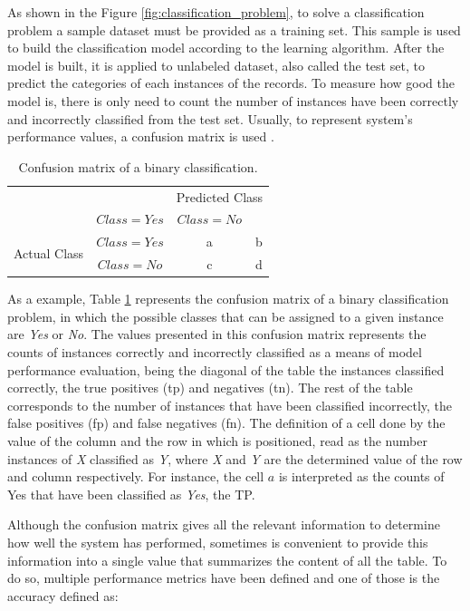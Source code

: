 As shown in the Figure \ref{fig:classification_problem}, to solve a classification problem a sample dataset must be provided as a training set. This sample is used to build the classification model according to the learning algorithm. After the model is built, it is applied to unlabeled dataset, also called the test set, to predict the categories of each instances of the records. To measure how good the model is, there is only need to count the number of instances have been correctly and incorrectly classified from the test set. Usually, to represent system's performance values, a confusion matrix is used \cite{hamilton2000confusion}. 


\begin{table}[!htp]
\centering
\begin{tabular}{ |c|c|c|c| }
\hline
\multicolumn{2}{|c|}{} & \multicolumn{2}{c|}{Predicted Class} \\
\hhline{~~--}
\multicolumn{2}{|c|}{} & $Class = Yes$ & $Class = No$ \\ \hline
\multirow{2}{*}{Actual Class} & $Class = Yes$ & a & b \\
\hhline{~---}
& $Class = No$ & c & d \\
\hline
\end{tabular}
\caption{Confusion matrix of a binary classification.}
\label{tab:confusion_matrix}
\end{table}

As a example, Table \ref{tab:confusion_matrix} represents the confusion matrix of a binary classification problem, in which the possible classes that can be assigned to a given instance are \textit{Yes} or \textit{No}. The values presented in this confusion matrix represents the counts of instances correctly and incorrectly classified as a means of model performance evaluation, being the diagonal of the table the instances classified correctly, the true positives (\acrshort{tp}) and negatives (\acrshort{tn}). The rest of the table corresponds to the number of instances that have been classified incorrectly, the false positives (\acrshort{fp}) and false negatives (\acrshort{fn}). The definition of a cell done by the value of the column and the row in which is positioned, read as the number instances of \textit{X} classified as \textit{Y}, where \textit{X} and \textit{Y} are the determined value of the row and column respectively. For instance, the cell $a$ is interpreted as the counts of Yes that have been classified as \textit{Yes}, the TP.

Although the confusion matrix gives all the relevant information to determine how well the system has performed, sometimes is convenient to provide this information into a single value that summarizes the content of all the table. To do so, multiple performance metrics have been defined and one of those is the accuracy defined as:

